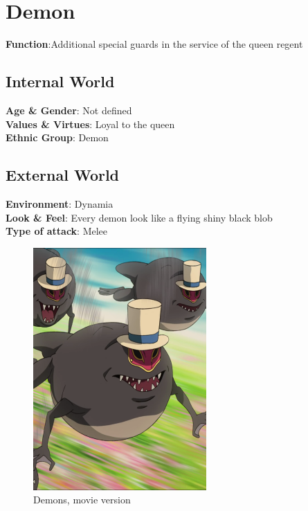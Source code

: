\section{Demon}

\begin{minipage}{0.5\textwidth}
\textbf{Function}:Additional special guards in the service of the queen regent

\subsection{Internal World}

\textbf{Age \& Gender}: Not defined \\
\textbf{Values \& Virtues}: Loyal to the queen\\
\textbf{Ethnic Group}: Demon

\subsection{External World}
\textbf{Environment}: Dynamia \\
\textbf{Look \& Feel}: Every demon look like a flying shiny black blob\\
\textbf{Type of attack}: Melee \\
\end{minipage}%
%
\hfill\begin{minipage}{0.4\textwidth}
\begin{figure}[H]
 \includegraphics{Images/Enemies/demon_portrait}
  \caption{Demons, movie version}
  \end{figure}
\end{minipage}


